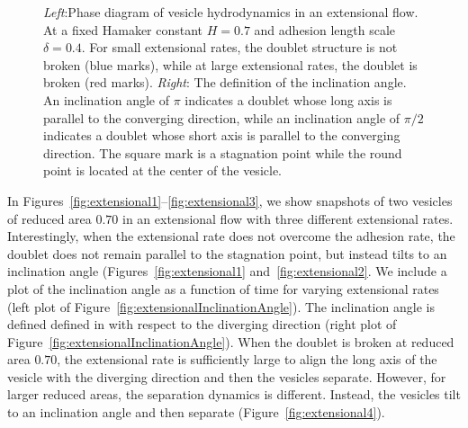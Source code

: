 \documentclass[prf,superscriptaddress,showpacs]{revtex4-1}
\begin{document}
\begin{figure}[htp]
\begin{minipage}{0.33\textwidth}
  \end{minipage}
  \caption{\label{fig:extensionalPhaseDiagram} {\em Left}:Phase diagram
  of vesicle hydrodynamics in an extensional flow.  At a fixed Hamaker
  constant $H=0.7$ and adhesion length scale $\delta=0.4$.  For small
  extensional rates, the doublet structure is not broken (blue marks),
  while at large extensional rates, the doublet is broken (red marks).
  {\em Right}: The definition of the inclination angle.  An inclination
  angle of $\pi$ indicates a doublet whose long axis is parallel to the
  converging direction, while an inclination angle of $\pi/2$ indicates
  a doublet whose short axis is parallel to the converging direction.
  The square mark is a stagnation point while the round point is located
  at the center of the vesicle.}
\end{figure}

In Figures~\ref{fig:extensional1}--\ref{fig:extensional3}, we show
snapshots of two vesicles of reduced area $0.70$ in an extensional flow
with three different extensional rates.  Interestingly, when the
extensional rate does not overcome the adhesion rate, the doublet does
not remain parallel to the stagnation point, but instead tilts to an
inclination angle (Figures~\ref{fig:extensional1}
and~\ref{fig:extensional2}.  We include a plot of the inclination angle
as a function of time for varying extensional rates (left plot of
Figure~\ref{fig:extensionalInclinationAngle}).  The inclination angle is
defined defined in with respect to the diverging direction (right plot
of Figure~\ref{fig:extensionalInclinationAngle}).  When the doublet is
broken at reduced area $0.70$, the extensional rate is sufficiently
large to align the long axis of the vesicle with the diverging direction
and then the vesicles separate.  However, for larger reduced areas, the
separation dynamics is different.  Instead, the vesicles tilt to an
inclination angle and then separate (Figure~\ref{fig:extensional4}).
\end{document}

